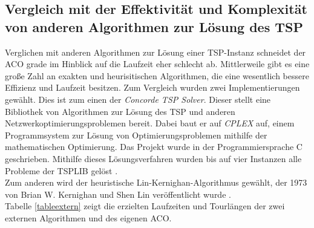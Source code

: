 \documentclass[doktyp=barbeit, sprache=german]{TUBAFarbeiten}
\begin{document}
\subsection{Vergleich mit der Effektivität und Komplexität von anderen Algorithmen zur Lösung des TSP}
Verglichen mit anderen Algorithmen zur Lösung einer TSP-Instanz schneidet der ACO grade im Hinblick auf die Laufzeit eher schlecht ab. Mittlerweile gibt es eine große Zahl an exakten und heurisitischen Algorithmen, die eine wesentlich bessere Effizienz und Laufzeit besitzen. Zum Vergleich wurden zwei Implementierungen gewählt. Dies ist zum einen der \textit{Concorde TSP Solver}. Dieser stellt eine Bibliothek von Algorithmen zur Lösung des TSP und anderen Netzwerkoptimierungsproblemen bereit. Dabei baut er auf \textit{CPLEX} auf, einem Programmsystem zur Lösung von Optimierungsproblemen mithilfe der mathematischen Optimierung. Das Projekt wurde in der Programmiersprache C geschrieben. Mithilfe dieses Lösungsverfahren wurden bis auf vier Instanzen alle Probleme der TSPLIB gelöst \cite{Concorde}.
\\Zum anderen wird der heuristische Lin-Kernighan-Algorithmus gewählt, der 1973 von Brian W. Kernighan und Shen Lin veröffentlicht wurde \cite{TSP}.
\\Tabelle \ref{tableextern} zeigt die erzielten Laufzeiten und Tourlängen der zwei externen Algorithmen und des eigenen ACO.
\end{document}
